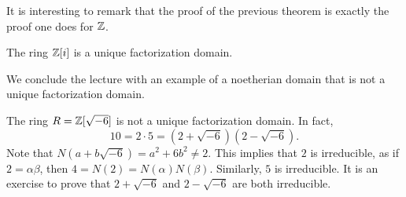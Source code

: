 It is interesting to remark that the proof 
of the previous theorem is exactly the proof
one does for $\mathbb{Z}$. 

\begin{example}
	The ring $\mathbb{Z}[i]$ is a unique factorization domain. 	
\end{example}

We conclude the lecture with an example 
of a noetherian domain that is not a unique factorization domain. 

\begin{example}
	The ring $R=\mathbb{Z}[\sqrt{-6}]$ is not a unique factorization domain. In fact,
	\[
	10=2\cdot 5=(2+\sqrt{-6})(2-\sqrt{-6}).
	\]	
	Note that $N(a+b\sqrt{-6})=a^2+6b^2\ne 2$. This implies that $2$ is irreducible, as 
	if $2=\alpha\beta$, then $4=N(2)=N(\alpha)N(\beta)$. 
	Similarly, $5$ is irreducible. It is an exercise to prove that 
	$2+\sqrt{-6}$ and $2-\sqrt{-6}$ are both irreducible. 
\end{example}
